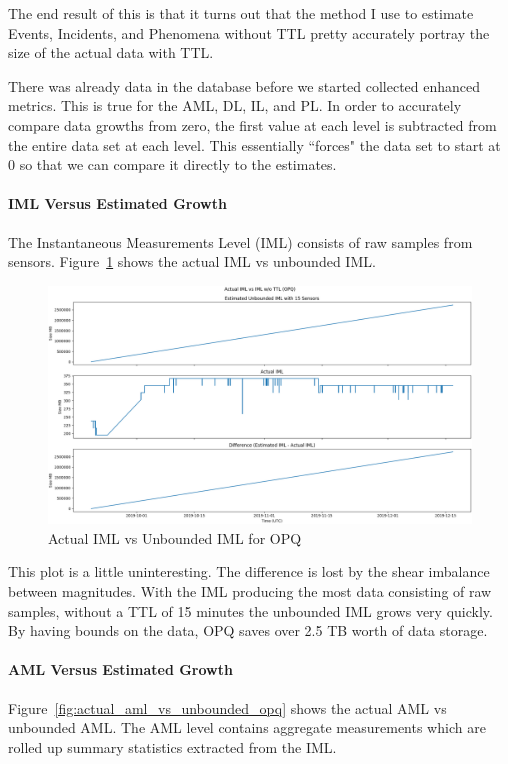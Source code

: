 The end result of this is that it turns out that the method I use to estimate Events, Incidents, and Phenomena without TTL pretty accurately portray the size of the actual data with TTL.

There was already data in the database before we started collected enhanced metrics. This is true for the AML, DL, IL, and PL. In order to accurately compare data growths from zero, the first value at each level is subtracted from the entire data set at each level. This essentially ``forces" the data set to start at 0 so that we can compare it directly to the estimates.

\paragraph{IML Versus Estimated Growth}
The Instantaneous Measurements Level (IML) consists of raw samples from sensors. Figure~\ref{fig:actual_iml_vs_unbounded_opq} shows the actual IML vs unbounded IML\@.

\begin{figure}[H]
    \centering
    \includegraphics[width=\linewidth]{figures/actual_iml_vs_unbounded_opq.png}
    \caption{Actual IML vs Unbounded IML for OPQ}
    \label{fig:actual_iml_vs_unbounded_opq}
\end{figure}

This plot is a little uninteresting. The difference is lost by the shear imbalance between magnitudes. With the IML producing the most data consisting of raw samples, without a TTL of 15 minutes the unbounded IML grows very quickly. By having bounds on the data, OPQ saves over 2.5 TB worth of data storage.

\paragraph{AML Versus Estimated Growth}
Figure~\ref{fig:actual_aml_vs_unbounded_opq} shows the actual AML vs unbounded AML. The AML level contains aggregate measurements which are rolled up summary statistics extracted from the IML\@.

